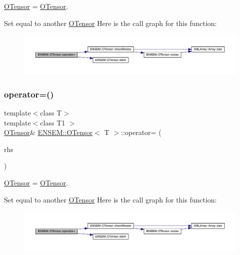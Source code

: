 \mbox{\hyperlink{classENSEM_1_1OTensor}{O\+Tensor}} = \mbox{\hyperlink{classENSEM_1_1OTensor}{O\+Tensor}}. 

Set equal to another \mbox{\hyperlink{classENSEM_1_1OTensor}{O\+Tensor}} Here is the call graph for this function\+:
\nopagebreak
\begin{figure}[H]
\begin{center}
\leavevmode
\includegraphics[width=350pt]{da/d8a/classENSEM_1_1OTensor_a96fac7277ac1df849789d53b761e5e68_cgraph}
\end{center}
\end{figure}
\mbox{\label{classENSEM_1_1OTensor_a96fac7277ac1df849789d53b761e5e68}} 
\subsubsection{\texorpdfstring{operator=()}{operator=()}\hspace{0.1cm}{\footnotesize\ttfamily [11/12]}}
{\footnotesize\ttfamily template$<$class T$>$ \\
template$<$class T1 $>$ \\
\mbox{\hyperlink{classENSEM_1_1OTensor}{O\+Tensor}}\& \mbox{\hyperlink{classENSEM_1_1OTensor}{E\+N\+S\+E\+M\+::\+O\+Tensor}}$<$ T $>$\+::operator= (\begin{DoxyParamCaption}\item[{const \mbox{\hyperlink{classENSEM_1_1OTensor}{O\+Tensor}}$<$ T1 $>$ \&}]{rhs }\end{DoxyParamCaption})\hspace{0.3cm}{\ttfamily [inline]}}



\mbox{\hyperlink{classENSEM_1_1OTensor}{O\+Tensor}} = \mbox{\hyperlink{classENSEM_1_1OTensor}{O\+Tensor}}. 

Set equal to another \mbox{\hyperlink{classENSEM_1_1OTensor}{O\+Tensor}} Here is the call graph for this function\+:
\nopagebreak
\begin{figure}[H]
\begin{center}
\leavevmode
\includegraphics[width=350pt]{da/d8a/classENSEM_1_1OTensor_a96fac7277ac1df849789d53b761e5e68_cgraph}
\end{center}
\end{figure}
\mbox{\label{classENSEM_1_1OTensor_a96fac7277ac1df849789d53b761e5e68}} 
